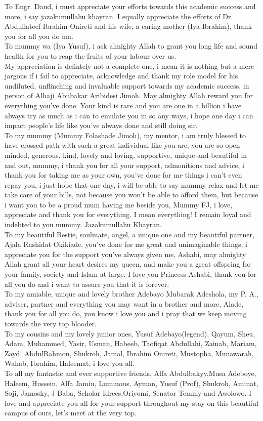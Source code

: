 \documentclass[a4paper, 12pt]{report}
\begin{document}
{To Engr. Daud, i must appreciate your efforts towards this academic success and more, i say jazakumullahu khayran. I equally appreciate the efforts of Dr. Abdullateef Ibrahim Onireti and his wife, a caring mother (Iya Ibrahim), thank you for all you do ma.\\
To mummy wa (Iya Yusuf), i ask almighty Allah to grant you long life and sound health for you to reap the fruits of your labour over us.\\
My appreciation is defintely not a complete one, i mean it is nothing but a mere jargons if i fail to appreciate, acknowledge and thank my role model for his undiluted, unflinching  and invaluable support towards my academic success, in person of Alhaji Abubakar Aribidesi Jimoh. May almighty Allah reward you for everything you've done. Your kind is rare and you are one in a billion i have always try as much as i can to emulate you in so any ways, i hope one day i can impact people's life like you've always done and still doing sir.\\
To my mummy (Mummy Folashade Jimoh), my mentor, i am truly blessed to have crossed path with such a great individual like you are, you are so open minded, generous, kind, lovely and loving, supportive, unique and beautiful in and out, mummy, i thank you for all your support, admonitions and advice, i thank you for taking me as your own, you've done for me things i can't even repay you, i just hope that one day, i will be able to say mummy relax and let me take care of your bills, not because you won't be able to afford them, but because i want you to be a proud mum having me beside you, Mummy FJ, i love, appreciate and thank you for everything. I mean everything! I remain loyal and indebted to you mummy. Jazakumullahu Khayran.\\
To my beautiful Bestie, soulmate, angel, a unique one and my beautiful partner, Ajala Rashidat Okikiade, you've done for me great and unimaginable things, i appreciate you for the support you've always given me, Ashabi, may almighty Allah grant all your heart desires my queen, and make you a great offspring for your family, society and Islam at large. I love you Princess Ashabi, thank you for all you do and i want to assure you that it is forever.\\
To my amiable, unique and lovely brother Adebayo Mubarak Adeshola, my P. A., adviser, partner and everything you may want in a brother and more, Alade, thank you for all you do, you know i love you and i pray that we keep moving towards the very top blooder.\\
To my cousins and my lovely junior ones, Yusuf Adebayo(legend), Qayum, Sheu, Adam, Muhammed, Yasir, Usman, Habeeb, Taofiqat Abdullahi, Zainab, Mariam, Zayd, AbdulRahmon, Shukroh, Jamal, Ibrahim Onireti, Mustopha, Munawarah, Wahab, Ibrahim, Haleemat, i love you all.\\
To all my fantastic and ever supportive friends, Alfa Abdulbakyy,Musa Adeboye, Haleem, Hussein, Alfa Jamiu, Luminous, Ayman, Yusuf (Prof), Shukroh, Aminat, Soji, Jamosky, J Baba, Scholar Idrees,Oriyomi, Senator Temmy and Awolowo. I love and appreciate you all for your support throughout my stay on this beautiful campus of ours, let's meet at the very top.


}
\end{document}
